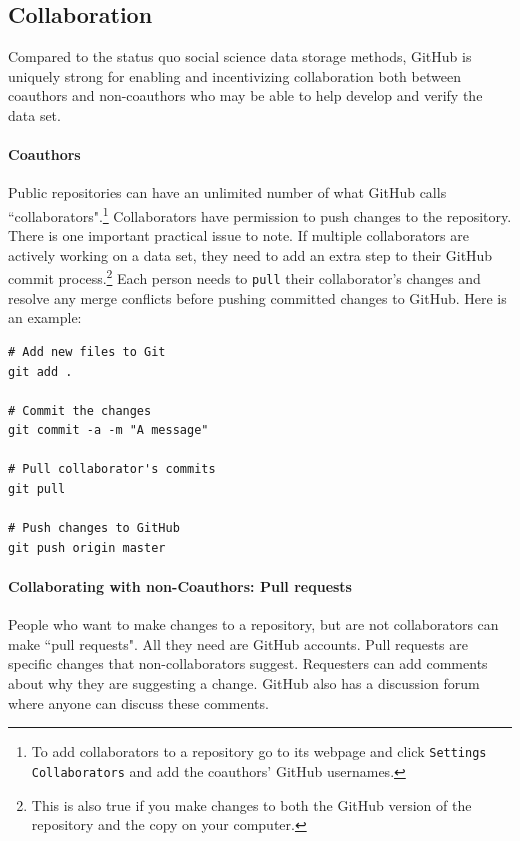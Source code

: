 \documentclass[twocolumn]{article}\usepackage{graphicx, color}
\makeatletter
\newenvironment{kframe}{%
 \def\at@end@of@kframe{}%
 \ifinner\ifhmode%
  \def\at@end@of@kframe{\end{minipage}}%
  \begin{minipage}{\columnwidth}%
 \fi\fi%
 \def\FrameCommand##1{\hskip\@totalleftmargin \hskip-\fboxsep
 \colorbox{shadecolor}{##1}\hskip-\fboxsep
     \hskip-\linewidth \hskip-\@totalleftmargin \hskip\columnwidth}%
 \MakeFramed {\advance\hsize-\width
   \@totalleftmargin\z@ \linewidth\hsize
   \@setminipage}}%
 {\par\unskip\endMakeFramed%
 \at@end@of@kframe}
\newenvironment{knitrout}{}{} %
\makeatother
\begin{document}
\subsection{Collaboration}

Compared to the status quo social science data storage methods, GitHub is uniquely strong for enabling and incentivizing collaboration both between coauthors and non-coauthors who may be able to help develop and verify the data set.  

\paragraph{Coauthors}

Public repositories can have an unlimited number of what GitHub calls ``collaborators".\footnote{To add collaborators to a repository go to its webpage and click \texttt{Settings} \textrightarrow \texttt{Collaborators} and add the coauthors' GitHub usernames.} Collaborators have permission to push changes to the repository. There is one important practical issue to note. If multiple collaborators are actively working on a data set, they need to add an extra step to their GitHub commit process.\footnote{This is also true if you make changes to both the GitHub version of the repository and the copy on your computer.} Each person needs to \texttt{pull} their collaborator's changes and resolve any merge conflicts before pushing committed changes to GitHub. Here is an example:

\begin{knitrout}
\color{fgcolor}\begin{kframe}
\begin{verbatim}
# Add new files to Git
git add .

# Commit the changes
git commit -a -m "A message"

# Pull collaborator's commits
git pull

# Push changes to GitHub
git push origin master
\end{verbatim}
\end{kframe}
\end{knitrout}


\paragraph{Collaborating with non-Coauthors: Pull requests}

People who want to make changes to a repository, but are not collaborators can make ``pull requests". All they need are GitHub accounts. Pull requests are specific changes that non-collaborators suggest. Requesters can add comments about why they are suggesting a change. GitHub also has a discussion forum where anyone can discuss these comments. 
\end{document}
